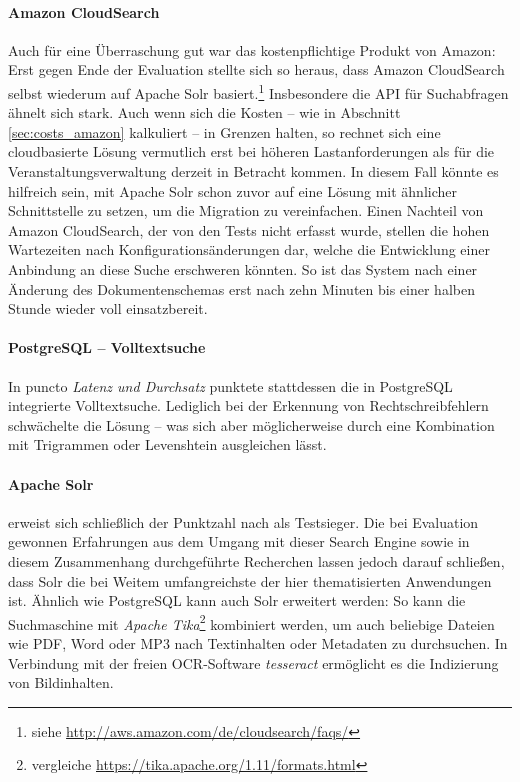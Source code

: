\paragraph{Amazon CloudSearch} Auch für eine Überraschung gut war das kostenpflichtige Produkt von Amazon: Erst gegen Ende der Evaluation stellte sich so heraus, dass Amazon CloudSearch selbst wiederum auf Apache Solr basiert.\footnote{siehe \url{http://aws.amazon.com/de/cloudsearch/faqs/}} Insbesondere die API für Suchabfragen ähnelt sich stark. Auch wenn sich die Kosten -- wie in Abschnitt \ref{sec:costs_amazon} kalkuliert -- in Grenzen halten, so rechnet sich eine cloudbasierte Lösung vermutlich erst bei höheren Lastanforderungen als für die Veranstaltungsverwaltung derzeit in Betracht kommen. In diesem Fall könnte es hilfreich sein, mit Apache Solr schon zuvor auf eine Lösung mit ähnlicher Schnittstelle zu setzen, um die Migration zu vereinfachen. Einen Nachteil von Amazon CloudSearch, der von den Tests nicht erfasst wurde, stellen die hohen Wartezeiten nach Konfigurationsänderungen dar, welche die Entwicklung einer Anbindung an diese Suche erschweren könnten. So ist das System nach einer Änderung des Dokumentenschemas erst nach zehn Minuten bis einer halben Stunde wieder voll einsatzbereit.

\paragraph{PostgreSQL -- Volltextsuche} In puncto \emph{Latenz und Durchsatz} punktete stattdessen die in PostgreSQL integrierte Volltextsuche. Lediglich bei der Erkennung von Rechtschreibfehlern schwächelte die Lösung -- was sich aber möglicherweise durch eine Kombination mit Trigrammen oder Levenshtein ausgleichen lässt.

\paragraph{Apache Solr} erweist sich schließlich der Punktzahl nach als Testsieger. Die bei Evaluation gewonnen Erfahrungen aus dem Umgang mit dieser Search Engine sowie in diesem Zusammenhang durchgeführte Recherchen lassen jedoch darauf schließen, dass Solr die bei Weitem umfangreichste der hier thematisierten Anwendungen ist. Ähnlich wie  PostgreSQL kann auch Solr erweitert werden: So kann die Suchmaschine mit \emph{Apache Tika}\footnote{vergleiche \url{https://tika.apache.org/1.11/formats.html}} kombiniert werden, um auch beliebige Dateien wie PDF, Word oder MP3 nach Textinhalten oder Metadaten zu durchsuchen. In Verbindung mit der freien OCR-Software \emph{tesseract} ermöglicht es die Indizierung von Bildinhalten.

